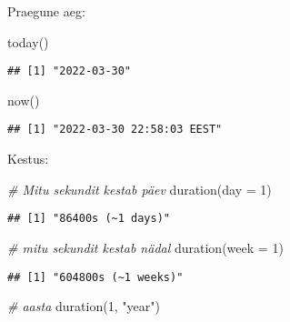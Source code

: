 \documentclass[
]{book}
\newenvironment{Shaded}{\begin{snugshade}}{\end{snugshade}}
\newcommand{\AttributeTok}[1]{\textcolor[rgb]{0.77,0.63,0.00}{#1}}
\newcommand{\CommentTok}[1]{\textcolor[rgb]{0.56,0.35,0.01}{\textit{#1}}}
\newcommand{\DecValTok}[1]{\textcolor[rgb]{0.00,0.00,0.81}{#1}}
\newcommand{\FunctionTok}[1]{\textcolor[rgb]{0.00,0.00,0.00}{#1}}
\newcommand{\NormalTok}[1]{#1}
\newcommand{\StringTok}[1]{\textcolor[rgb]{0.31,0.60,0.02}{#1}}
\begin{document}
Praegune aeg:

\begin{Shaded}
\begin{Highlighting}[]
\FunctionTok{today}\NormalTok{()}
\end{Highlighting}
\end{Shaded}

\begin{verbatim}
## [1] "2022-03-30"
\end{verbatim}

\begin{Shaded}
\begin{Highlighting}[]
\FunctionTok{now}\NormalTok{()}
\end{Highlighting}
\end{Shaded}

\begin{verbatim}
## [1] "2022-03-30 22:58:03 EEST"
\end{verbatim}

Kestus:

\begin{Shaded}
\begin{Highlighting}[]
\CommentTok{\# Mitu sekundit kestab päev}
\FunctionTok{duration}\NormalTok{(}\AttributeTok{day =} \DecValTok{1}\NormalTok{)}
\end{Highlighting}
\end{Shaded}

\begin{verbatim}
## [1] "86400s (~1 days)"
\end{verbatim}

\begin{Shaded}
\begin{Highlighting}[]
\CommentTok{\# mitu sekundit kestab nädal}
\FunctionTok{duration}\NormalTok{(}\AttributeTok{week =} \DecValTok{1}\NormalTok{)}
\end{Highlighting}
\end{Shaded}

\begin{verbatim}
## [1] "604800s (~1 weeks)"
\end{verbatim}

\begin{Shaded}
\begin{Highlighting}[]
\CommentTok{\# aasta}
\FunctionTok{duration}\NormalTok{(}\DecValTok{1}\NormalTok{, }\StringTok{"year"}\NormalTok{)}
\end{Highlighting}
\end{Shaded}
\end{document}
